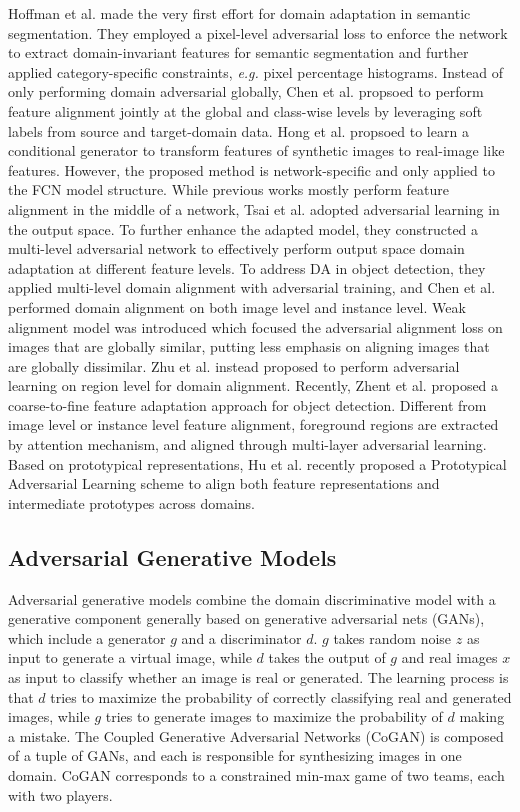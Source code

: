 \documentclass[conference]{IEEEtran}
\begin{document}
Hoffman et al. made the very first effort for domain adaptation in semantic segmentation.
They employed a pixel-level adversarial loss to enforce the network 
to extract domain-invariant features for semantic segmentation and further
applied category-specific constraints, \textit{e.g.} pixel percentage histograms.
Instead of only performing domain adversarial globally, Chen et al. 
propsoed to perform feature alignment jointly at the global and class-wise 
levels by leveraging soft labels from source and target-domain data.
Hong et al. propsoed to learn a conditional generator to transform features 
of synthetic images to real-image like features. 
However, the proposed method is network-specific and only applied to the FCN
model structure.
While previous works mostly perform feature alignment in the middle of a network,
Tsai et al. adopted adversarial learning in the output space.
To further enhance the adapted model, they constructed a multi-level adversarial network
to effectively perform output space domain adaptation at different feature levels.
To address DA in object detection, they applied multi-level domain alignment
with adversarial training, and Chen et al. performed domain alignment 
on both image level and instance level. 
Weak alignment model was introduced which focused the adversarial alignment loss
on images that are globally similar, putting less emphasis on aligning images 
that are globally dissimilar. 
Zhu et al. instead proposed to perform adversarial learning on region level for domain alignment.
Recently, Zhent et al. proposed a coarse-to-fine feature adaptation approach
for object detection. 
Different from image level or instance level feature alignment, foreground 
regions are extracted by attention mechanism, and aligned through multi-layer 
adversarial learning. 
Based on prototypical representations, Hu et al. recently proposed a Prototypical 
Adversarial Learning scheme to align both feature representations and intermediate 
prototypes across domains.

\subsection{Adversarial Generative Models}
Adversarial generative models combine the domain discriminative model with 
a generative component generally based on generative adversarial nets (GANs),
which include a generator $g$ and a discriminator $d$. $g$ takes random
noise $z$ as input to generate a virtual image, while $d$ takes the output of $g$
 and real images $x$ as input to classify whether an image is real or generated.
 The learning process is that $d$ tries to maximize the probability of correctly 
 classifying real and generated images, while $g$ tries to generate images 
 to maximize the probability of $d$ making a mistake. 
 The Coupled Generative Adversarial Networks (CoGAN) is composed of a tuple 
 of GANs, and each is responsible for synthesizing images in one domain.
 CoGAN corresponds to a constrained min-max game of two teams, each with two players.
\end{document}
